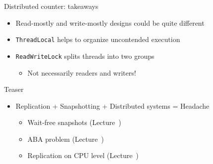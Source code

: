 \begin{frame}[t,fragile]{Distributed counter: takeaways}

\begin{itemize}
    \item Read-mostly and write-mostly designs could be quite different
    \item \texttt{ThreadLocal} helps to organize uncontended execution
    \item \texttt{ReadWriteLock} splits threads into two groups
    \begin{itemize}
        \item Not necessarily readers and writers!
    \end{itemize}    
\end{itemize}

\pause
Teaser 
\pause
\begin{itemize}
    \item Replication + Snapshotting + Distributed systems = Headache 
    \pause 
    \begin{itemize}
        \item Wait-free snapshots (Lecture~\foundationsPlusNum)
        \item ABA problem (Lecture~\atomicsNum)
        \item Replication on CPU level (Lecture~\cacheCoherencyNum)
    \end{itemize}
\end{itemize}
\end{frame}


